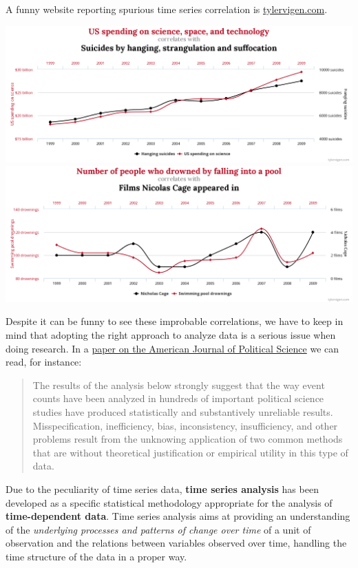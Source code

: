 \documentclass[
]{article}
\begin{document}
A funny website reporting spurious time series correlation is \href{https://www.tylervigen.com/spurious-correlations}{tylervigen.com}.

\includegraphics[width=28.89in]{images/chart}
\includegraphics[width=28.89in]{images/chart-2}

Despite it can be funny to see these improbable correlations, we have to keep in mind that adopting the right approach to analyze data is a serious issue when doing research. In a \href{https://gking.harvard.edu/files/gking/files/epr.pdf}{paper on the American Journal of Political Science} we can read, for instance:

\begin{quote}
The results of the analysis below strongly suggest that the way event counts have been analyzed in hundreds of important political science studies have produced statistically and substantively unreliable results. Misspecification, inefficiency, bias, inconsistency, insufficiency, and other problems result from the unknowing application of two common methods that are without theoretical justification or empirical utility in this type of data.
\end{quote}

Due to the peculiarity of time series data, \textbf{time series analysis} has been developed as a specific statistical methodology appropriate for the analysis of \textbf{time-dependent data}. Time series analysis aims at providing an understanding of the \emph{underlying processes and patterns of change over time} of a unit of observation and the relations between variables observed over time, handling the time structure of the data in a proper way.
\end{document}
